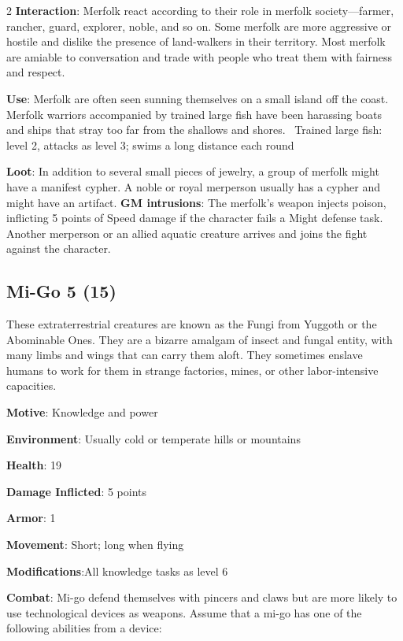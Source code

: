 \begin{multicols}{2}
\textbf{Interaction}: Merfolk react according to their role in merfolk society—farmer, rancher, guard, explorer, noble, and so on. Some merfolk are more aggressive or hostile and dislike the presence of land-walkers in their territory. Most merfolk are amiable to conversation and trade with people who treat them with fairness and respect. 

\textbf{Use}: Merfolk are often seen sunning themselves on a small island off the coast. Merfolk warriors accompanied by trained large fish have been harassing boats and ships that stray too far from the shallows and shores. 
Trained large fish: level 2, attacks as level 3; swims a long distance each round

\textbf{Loot}: In addition to several small pieces of jewelry, a group of merfolk might have a manifest cypher. A noble or royal merperson usually has a cypher and might have an artifact.
\textbf{GM intrusions}: The merfolk’s weapon injects poison, inflicting 5 points of Speed damage if the character fails a Might defense task. Another merperson or an allied aquatic creature arrives and joins the fight against the character.

\subsection{Mi-Go	5 (15)}

These extraterrestrial creatures are known as the Fungi from Yuggoth or the Abominable Ones. They are a bizarre amalgam of insect and fungal entity, with many limbs and wings that can carry them aloft. They sometimes enslave humans to work for them in strange factories, mines, or other labor-intensive capacities.

\textbf{Motive}: Knowledge and power

\textbf{Environment}: Usually cold or temperate hills or mountains

\textbf{Health}: 19

\textbf{Damage Inflicted}: 5 points

\textbf{Armor}: 1

\textbf{Movement}: Short; long when flying

\textbf{Modifications}:All knowledge tasks as level 6

\textbf{Combat}: Mi-go defend themselves with pincers and claws but are more likely to use technological devices as weapons. Assume that a mi-go has one of the following abilities from a device:


\end{multicols}
